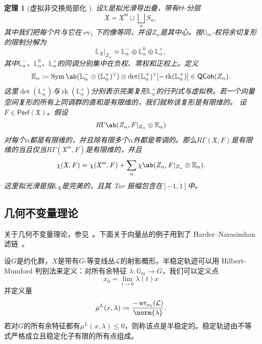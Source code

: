 \documentclass{amsart}
\newtheorem{thm}{定理}[section]
\theoremstyle{definition}
\theoremstyle{remark}
\theoremstyle{plain}
\theoremstyle{definition}
\theoremstyle{remark}
\newcommand{\G}{\mathbb{G}}
\newcommand{\E}{\mathbb{E}}
\renewcommand{\L}{\mathbb{L}}
\newcommand{\mc}[1]{\mathcal{#1}}
\newcommand{\mf}[1]{\mathfrak{#1}}
\newcommand{\mr}[1]{\mathrm{#1}}
\newcommand{\on}[1]{\operatorname{#1}}
\newcommand{\ms}[1]{\mathsf{#1}}
\newcommand{\1}{\mathbf{1}}
\newcommand{\2}{\mathbf{2}}
\newcommand{\3}{\mathbf{3}}
\DeclareMathOperator{\ev}{ev}
\begin{document}
\begin{thm}[虚拟非交换局部化 {\cite[定理~5.1]{HLlocalization}}]
    设\(\mf{X}\)是拟光滑导出叠，带有\(\Theta\)-分层
    \[
        \mf{X}
        =
        \mf{X}^{\mr{ss}}
        \sqcup
        \bigsqcup_\alpha S_\alpha,
    \]
    其中我们把每个片与它在\(\ev_1\)下的像等同，并设\(Z_\alpha\)是其中心。按\(\G_m\)-权将余切复形的限制分解为
    \[
        \L_{\mf{X}}|_{Z_\alpha}
        \simeq
        \L_\alpha^-
        \oplus
        \L_\alpha^0
        \oplus
        \L_\alpha^+,
    \]
    其中\(\L_\alpha^-\)、\(\L_\alpha^0\)、\(\L_\alpha^+\)的同调分别集中在负权、零权和正权上。定义
    \[
        \E_\alpha
        \coloneqq
        \on{Sym}\ab(
            \L_\alpha^-
            \oplus
            (\L_\alpha^+)^\vee
        )
        \otimes
        \det(\L_\alpha^+)^\vee
        [-\on{rk}(\L_\alpha^+)]
        \in
        \ms{QCoh}(Z_\alpha).
    \]
    这里\(\det(\L_\alpha^+)\)与\(\on{rk}(\L_\alpha^+)\)分别表示完美复形\(\L_\alpha^+\)的行列式与虚拟秩。若一个向量空间复形的所有上同调群的直和是有限维的，我们就称该复形是有限维的。
    设\(F\in\ms{Perf}(\mf{X})\)。假设
    \[
        R\Gamma\ab(
            Z_\alpha,
            F|_{Z_\alpha}\otimes\E_\alpha
        )
    \]
    对每个\(\alpha\)都是有限维的，并且除有限多个\(\alpha\)外都是零调的。那么\(R\Gamma(\mf{X},F)\)是有限维的当且仅当\(R\Gamma(\mf{X}^{\mr{ss}},F)\)是有限维的，并且
    \[
        \chi(\mf{X},F)
        =
        \chi(\mf{X}^{\mr{ss}},F)
        +
        \sum_\alpha
        \chi\ab(
            Z_\alpha,
            F|_{Z_\alpha}\otimes\E_\alpha
        ).
    \]
    这里拟光滑是指\(\L_{\mf{X}}\)是完美的，且其 Tor 振幅包含在\([-1,1]\)中。
\end{thm}


\subsection{几何不变量理论}%
\label{sub:Geometric invariant theory}

关于几何不变量理论，参见~\cite{MFK1994}。下面关于向量丛的例子用到了 Harder--Narasimhan 滤链~\cite{HN1975}。

设\(G\)是约化群，\(X\)是带有\(G\)-等变线丛\(\mc{L}\)的射影概形。半稳定轨迹可以用 Hilbert-Mumford 判别法来定义：对所有余特征
\(\lambda \colon \G_m \to G\)，我们可以定义点
\[ x_0 = \lim_{t \to 0} \lambda(t) x \]
并定义量
\[ \mu^L(x, \lambda) \coloneqq \frac{-\on{wt}_{x_0}(\mc{L})}{\norm{\lambda}}. \]
若对\(G\)的所有余特征都有\(\mu^L(x, \lambda) \leq 0\)，则称该点是半稳定的。稳定轨迹由不等式严格成立且稳定化子有限的所有点组成。
\end{document}
